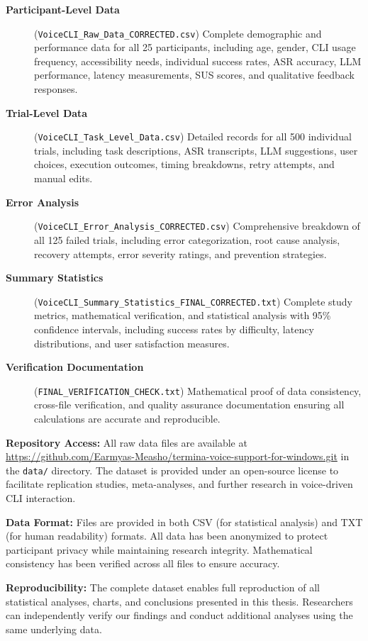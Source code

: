 \documentclass[a4paper,12pt]{article}
\begin{document}
\begin{description}
\item[\textbf{Participant-Level Data}] (\texttt{VoiceCLI\_Raw\_Data\_CORRECTED.csv})
Complete demographic and performance data for all 25 participants, including age, gender, CLI usage frequency, accessibility needs, individual success rates, ASR accuracy, LLM performance, latency measurements, SUS scores, and qualitative feedback responses.

\item[\textbf{Trial-Level Data}] (\texttt{VoiceCLI\_Task\_Level\_Data.csv})
Detailed records for all 500 individual trials, including task descriptions, ASR transcripts, LLM suggestions, user choices, execution outcomes, timing breakdowns, retry attempts, and manual edits.

\item[\textbf{Error Analysis}] (\texttt{VoiceCLI\_Error\_Analysis\_CORRECTED.csv})
Comprehensive breakdown of all 125 failed trials, including error categorization, root cause analysis, recovery attempts, error severity ratings, and prevention strategies.

\item[\textbf{Summary Statistics}] (\texttt{VoiceCLI\_Summary\_Statistics\_FINAL\_CORRECTED.txt})
Complete study metrics, mathematical verification, and statistical analysis with 95\% confidence intervals, including success rates by difficulty, latency distributions, and user satisfaction measures.

\item[\textbf{Verification Documentation}] (\texttt{FINAL\_VERIFICATION\_CHECK.txt})
Mathematical proof of data consistency, cross-file verification, and quality assurance documentation ensuring all calculations are accurate and reproducible.
\end{description}

\textbf{Repository Access:} All raw data files are available at \url{https://github.com/Earmyas-Measho/termina-voice-support-for-windows.git} in the \texttt{data/} directory. The dataset is provided under an open-source license to facilitate replication studies, meta-analyses, and further research in voice-driven CLI interaction.

\textbf{Data Format:} Files are provided in both CSV (for statistical analysis) and TXT (for human readability) formats. All data has been anonymized to protect participant privacy while maintaining research integrity. Mathematical consistency has been verified across all files to ensure accuracy.

\textbf{Reproducibility:} The complete dataset enables full reproduction of all statistical analyses, charts, and conclusions presented in this thesis. Researchers can independently verify our findings and conduct additional analyses using the same underlying data.
\end{document}
